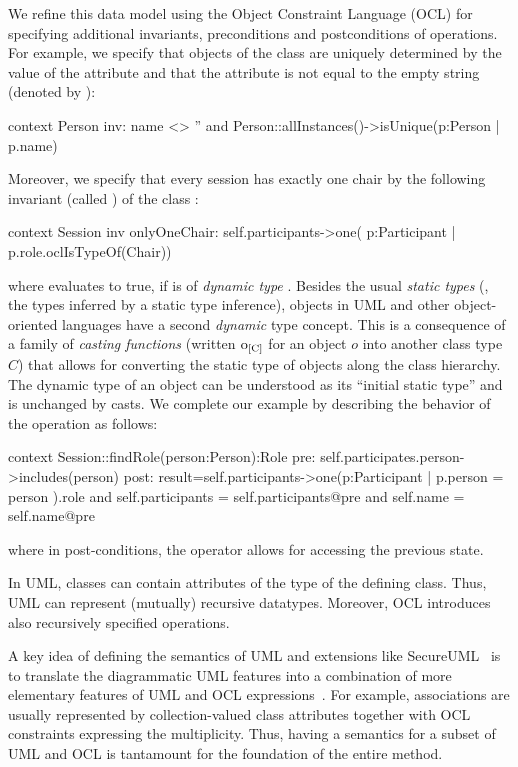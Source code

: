 We refine this data model using the Object Constraint Language (OCL)
for specifying additional invariants, preconditions and postconditions
of operations. For example, we specify that objects of the class
 are uniquely determined by the value of the
 attribute and that the attribute  is
not equal to the empty string (denoted by ):
\begin{ocl}
context Person
  inv: name <> '' and
       Person::allInstances()->isUnique(p:Person | p.name)
\end{ocl}
Moreover, we specify that every session has exactly one chair by the
following invariant (called ) of the class
:
\begin{ocl}
context Session
  inv onlyOneChair: self.participants->one( p:Participant |
                                      p.role.oclIsTypeOf(Chair))
\end{ocl}
where  evaluates to true, if
 is of \emph{dynamic type}
. Besides the usual \emph{static types} (\ie, the
types inferred by a static type inference), objects in UML and other
object-oriented languages have a second \emph{dynamic} type concept.
This is a consequence of a family of \emph{casting functions} (written
$\typeCast{o}{C}$ for an object $o$ into another class type $C$) that
allows for converting the static type of objects along the class
hierarchy. The dynamic type of an object can be understood as its
``initial static type'' and is unchanged by casts. We complete our
example by describing the behavior of the operation
 as follows:
\begin{ocl}
context Session::findRole(person:Person):Role
  pre:  self.participates.person->includes(person)
  post: result=self.participants->one(p:Participant |
                                p.person = person ).role
        and self.participants = self.participants@pre
        and self.name = self.name@pre
\end{ocl}
where in post-conditions, the operator  allows for
accessing the previous state.

In UML, classes can contain attributes of the type of the
defining class.  Thus, UML can represent (mutually) recursive
datatypes. Moreover, OCL introduces also recursively specified
operations.

A key idea of defining the semantics of UML and extensions like
SecureUML~\cite{brucker.ea:transformation:2006} is to translate the
diagrammatic UML features into a combination of more elementary
features of UML and OCL
expressions~\cite{gogolla.ea:expressing:2001}. For example,
associations are usually represented by collection-valued class
attributes together with OCL constraints expressing the
multiplicity. Thus, having a semantics for a subset of UML and OCL is
tantamount for the foundation of the entire method.






